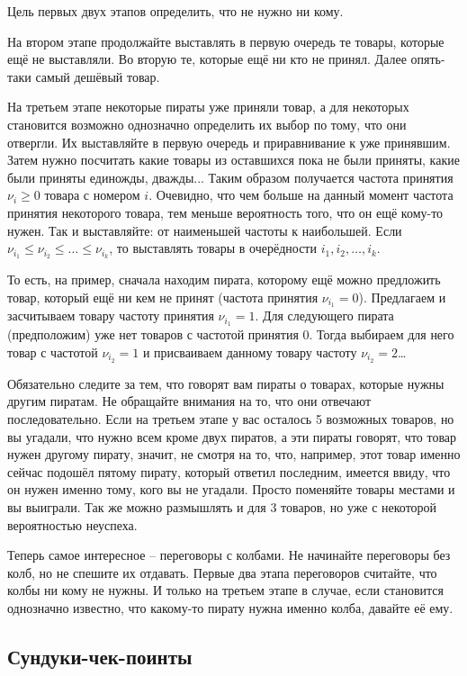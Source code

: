 Цель первых двух этапов определить, что не нужно ни кому.

На втором этапе продолжайте выставлять в первую очередь те товары, которые ещё не выставляли. 
Во вторую те, которые ещё ни кто не принял. 
Далее опять-таки самый дешёвый товар.

На третьем этапе некоторые пираты уже приняли товар, а для некоторых становится возможно однозначно определить их выбор по тому, что они отвергли. 
Их выставляйте в первую очередь и приравнивание к уже принявшим. 
Затем нужно посчитать какие товары из оставшихся пока не были приняты, какие были приняты единожды, дважды... 
Таким образом получается частота принятия $\nu_i \geqslant 0$ товара с номером $i$.
Очевидно, что чем больше на данный момент частота принятия некоторого товара, тем меньше вероятность того, что он ещё кому-то нужен. 
Так и выставляйте: от наименьшей частоты  к наибольшей.
Если $\nu_{i_1} \leqslant \nu_{i_2} \leqslant \ldots \leqslant \nu_{i_k}$, то выставлять товары в очерёдности $i_1, i_2, \ldots, i_k$. 

То есть, на пример, сначала находим пирата, которому ещё можно предложить товар, который ещё ни кем не принят (частота принятия $\nu_{i_1} = 0$). Предлагаем и засчитываем товару частоту принятия $\nu_{i_1} = 1$. Для следующего пирата (предположим) уже нет товаров с частотой принятия 0. Тогда выбираем для него товар с частотой $\nu_{i_2} = 1$ и присваиваем данному товару частоту $\nu_{i_2} = 2$\ldots

Обязательно следите за тем, что говорят вам пираты о товарах, которые нужны другим пиратам.
Не обращайте внимания на то, что они отвечают последовательно.
Если на третьем этапе у вас осталось 5 возможных товаров, но вы угадали, что нужно всем кроме двух пиратов, а эти пираты говорят, что товар нужен другому пирату, значит, не смотря на то, что, например, этот товар именно сейчас подошёл пятому пирату, который ответил последним, имеется ввиду, что он нужен именно тому, кого вы не угадали.
Просто поменяйте товары местами и вы выиграли.
Так же можно размышлять и для 3 товаров, но уже с некоторой вероятностью неуспеха.

Теперь самое интересное -- переговоры с колбами. 
Не начинайте переговоры без колб, но не спешите их отдавать. 
Первые два этапа переговоров считайте, что колбы ни кому не нужны. 
И только на третьем этапе в случае, если становится однозначно известно, что какому-то пирату нужна именно колба, давайте её ему.

\subsection{Сундуки-чек-поинты}

